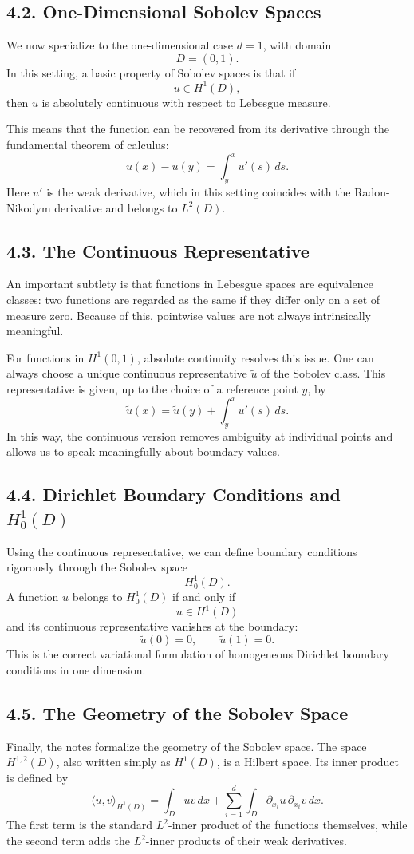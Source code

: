 \documentclass[11pt]{article}
\theoremstyle{definition}
\theoremstyle{remark}
\begin{document}
\subsection*{4.2. One-Dimensional Sobolev Spaces}
We now specialize to the one-dimensional case \(d=1\), with domain
\[
D=(0,1).
\]
In this setting, a basic property of Sobolev spaces is that if
\[
u\in H^1(D),
\]
then \(u\) is absolutely continuous with respect to Lebesgue measure.

This means that the function can be recovered from its derivative through the fundamental theorem of calculus:
\[
u(x)-u(y)=\int_y^x u'(s)\,ds.
\]
Here \(u'\) is the weak derivative, which in this setting coincides with the Radon-Nikodym derivative and belongs to \(L^2(D)\).

\subsection*{4.3. The Continuous Representative}
An important subtlety is that functions in Lebesgue spaces are equivalence classes: two functions are regarded as the same if they differ only on a set of measure zero. Because of this, pointwise values are not always intrinsically meaningful.

For functions in \(H^1(0,1)\), absolute continuity resolves this issue. One can always choose a unique continuous representative \(\widetilde u\) of the Sobolev class. This representative is given, up to the choice of a reference point \(y\), by
\[
\widetilde u(x)=\widetilde u(y)+\int_y^x u'(s)\,ds.
\]
In this way, the continuous version removes ambiguity at individual points and allows us to speak meaningfully about boundary values.

\subsection*{4.4. Dirichlet Boundary Conditions and \(H_0^1(D)\)}
Using the continuous representative, we can define boundary conditions rigorously through the Sobolev space
\[
H_0^1(D).
\]
A function \(u\) belongs to \(H_0^1(D)\) if and only if
\[
u\in H^1(D)
\]
and its continuous representative vanishes at the boundary:
\[
\widetilde u(0)=0,
\qquad
\widetilde u(1)=0.
\]
This is the correct variational formulation of homogeneous Dirichlet boundary conditions in one dimension.

\subsection*{4.5. The Geometry of the Sobolev Space}
Finally, the notes formalize the geometry of the Sobolev space. The space \(H^{1,2}(D)\), also written simply as \(H^1(D)\), is a Hilbert space. Its inner product is defined by
\[
\langle u,v\rangle_{H^1(D)}
=
\int_D uv\,dx+\sum_{i=1}^d \int_D \partial_{x_i}u\,\partial_{x_i}v\,dx.
\]
The first term is the standard \(L^2\)-inner product of the functions themselves, while the second term adds the \(L^2\)-inner products of their weak derivatives.
\end{document}
